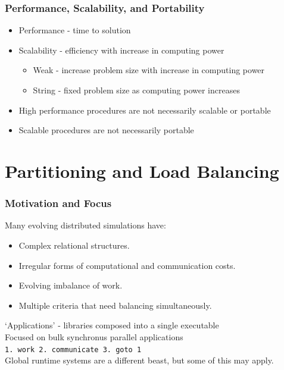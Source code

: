 \documentclass[aspectratio=169]{beamer}
\begin{document}
\begin{frame}
  \frametitle{Performance, Scalability, and Portability}
  \begin{itemize}
  \item Performance - time to solution
  \item Scalability - efficiency with increase in computing power
    \begin{itemize}
    \item Weak - increase problem size with increase in computing power
    \item String - fixed problem size as computing power increases
    \end{itemize}
  \item High performance procedures are not necessarily
    scalable or portable
  \item Scalable procedures are not necessarily portable
  \end{itemize}
\end{frame}

\section{Partitioning and Load Balancing}
\begin{frame}
  \frametitle{Motivation and Focus}
  Many evolving distributed simulations have: \\
  \begin{itemize}
    \item Complex relational structures.
    \item Irregular forms of computational and communication costs.
    \item Evolving imbalance of work. %
    \item Multiple criteria that need balancing simultaneously.
  \end{itemize}
  `Applications' - libraries composed into a single executable \\
  Focused on bulk synchronus parallel applications \\
  \small{\texttt{1. work 2. communicate 3. goto 1}} \\
  \bigskip
  Global runtime systems are a different beast, but some of this may apply.
\end{frame}
\end{document}
